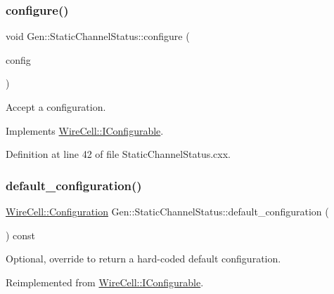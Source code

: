 \subsubsection{\texorpdfstring{configure()}{configure()}}
{\footnotesize\ttfamily void Gen\+::\+Static\+Channel\+Status\+::configure (\begin{DoxyParamCaption}\item[{const \hyperlink{namespace_wire_cell_a9f705541fc1d46c608b3d32c182333ee}{Wire\+Cell\+::\+Configuration} \&}]{config }\end{DoxyParamCaption})\hspace{0.3cm}{\ttfamily [virtual]}}



Accept a configuration. 



Implements \hyperlink{class_wire_cell_1_1_i_configurable_a57ff687923a724093df3de59c6ff237d}{Wire\+Cell\+::\+I\+Configurable}.



Definition at line 42 of file Static\+Channel\+Status.\+cxx.

\mbox{\label{class_wire_cell_1_1_gen_1_1_static_channel_status_a87b0418767237ba9a5bb40f71e9b82d2}} 
\subsubsection{\texorpdfstring{default\+\_\+configuration()}{default\_configuration()}}
{\footnotesize\ttfamily \hyperlink{namespace_wire_cell_a9f705541fc1d46c608b3d32c182333ee}{Wire\+Cell\+::\+Configuration} Gen\+::\+Static\+Channel\+Status\+::default\+\_\+configuration (\begin{DoxyParamCaption}{ }\end{DoxyParamCaption}) const\hspace{0.3cm}{\ttfamily [virtual]}}



Optional, override to return a hard-\/coded default configuration. 



Reimplemented from \hyperlink{class_wire_cell_1_1_i_configurable_a54841b2da3d1ea02189478bff96f7998}{Wire\+Cell\+::\+I\+Configurable}.




